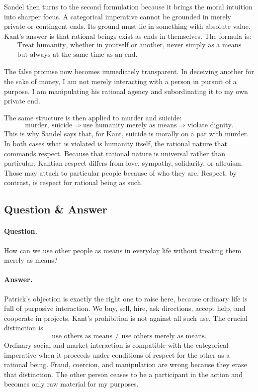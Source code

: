 Sandel then turns to the second formulation because it brings the moral intuition into sharper focus. A categorical imperative cannot be grounded in merely private or contingent ends. Its ground must lie in something with absolute value. Kant's answer is that rational beings exist as ends in themselves. The formula is:
\begin{equation}
\begin{aligned}
\text{Treat humanity, whether in yourself or another, never simply as a means}\\
\text{but always at the same time as an end.}
\end{aligned}
\end{equation}

The false promise now becomes immediately transparent. In deceiving another for the sake of money, I am not merely interacting with a person in pursuit of a purpose. I am manipulating his rational agency and subordinating it to my own private end.

The same structure is then applied to murder and suicide:
\begin{equation}
\text{murder},\ \text{suicide} \Longrightarrow \text{use humanity merely as means} \Longrightarrow \text{violate dignity}.
\end{equation}
This is why Sandel says that, for Kant, suicide is morally on a par with murder. In both cases what is violated is humanity itself, the rational nature that commands respect. Because that rational nature is universal rather than particular, Kantian respect differs from love, sympathy, solidarity, or altruism. Those may attach to particular people because of who they are. Respect, by contrast, is respect for rational being as such.

\subsection{Question \& Answer}

\paragraph{Question.} How can we use other people as means in everyday life without treating them merely as means?

\paragraph{Answer.} Patrick's objection is exactly the right one to raise here, because ordinary life is full of purposive interaction. We buy, sell, hire, ask directions, accept help, and cooperate in projects. Kant's prohibition is not against all such use. The crucial distinction is
\begin{equation}
\text{use others as means} \neq \text{use others merely as means}.
\end{equation}
Ordinary social and market interaction is compatible with the categorical imperative when it proceeds under conditions of respect for the other as a rational being. Fraud, coercion, and manipulation are wrong because they erase that distinction. The other person ceases to be a participant in the action and becomes only raw material for my purposes.

